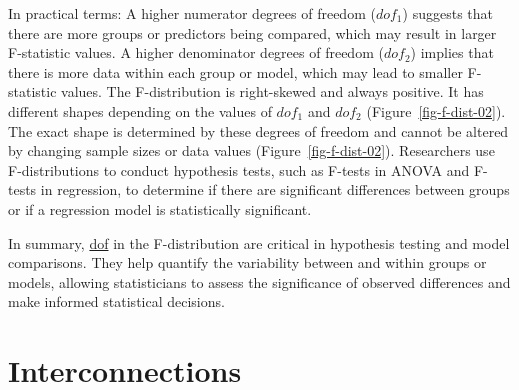 \documentclass[
  a4paper,
]{scrbook}
\begin{document}
In practical terms: A higher numerator degrees of freedom (\(dof_1\))
suggests that there are more groups or predictors being compared, which
may result in larger F-statistic values. A higher denominator degrees of
freedom (\(dof_2\)) implies that there is more data within each group or
model, which may lead to smaller F-statistic values. The F-distribution
is right-skewed and always positive. It has different shapes depending
on the values of \(dof_1\) and \(dof_2\) (Figure~\ref{fig-f-dist-02}).
The exact shape is determined by these degrees of freedom and cannot be
altered by changing sample sizes or data values
(Figure~\ref{fig-f-dist-02}). Researchers use F-distributions to conduct
hypothesis tests, such as F-tests in ANOVA and F-tests in regression, to
determine if there are significant differences between groups or if a
regression model is statistically significant.

In summary, \hyperref[acronyms_dof]{dof} in the F-distribution are
critical in hypothesis testing and model comparisons. They help quantify
the variability between and within groups or models, allowing
statisticians to assess the significance of observed differences and
make informed statistical decisions.

\section{Interconnections}\label{interconnections}
\end{document}
